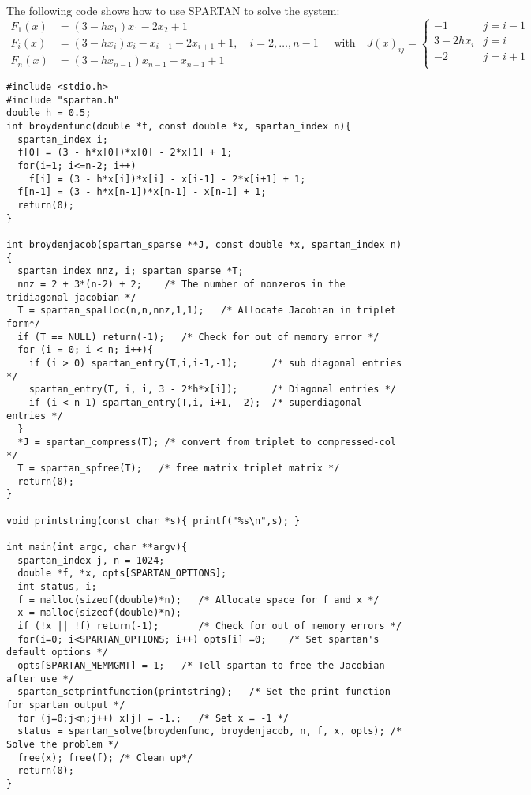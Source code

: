 \documentclass[10pt]{article}
\newcommand{\solverf}{\sffamily}
\newcommand{\spartan}{{\solverf SPARTAN}}
\begin{document}
The following code shows how to use \spartan{} to solve
the system:
\begin{equation}
\begin{aligned} F_1(x) &= (3 - h x_1)x_1 - 2 x_2 + 1 \\
              F_i(x) &= (3 - h x_i)x_i - x_{i-1} - 2 x_{i+1} + 1, \quad i=2, \ldots, n-1\\
              F_n(x) &= (3 - h x_{n-1}) x_{n-1} - x_{n-1} + 1
\end{aligned}
\quad \text{with} \quad
J(x)_{ij} = 
\begin{cases} -1 & j = i-1 \\
3 - 2hx_i        & j = i   \\
-2               & j = i+1 \\
\end{cases}
\end{equation}
\begin{Verbatim}[fontsize=\small]
#include <stdio.h>
#include "spartan.h"
double h = 0.5;
int broydenfunc(double *f, const double *x, spartan_index n){
  spartan_index i;
  f[0] = (3 - h*x[0])*x[0] - 2*x[1] + 1;
  for(i=1; i<=n-2; i++)
    f[i] = (3 - h*x[i])*x[i] - x[i-1] - 2*x[i+1] + 1;
  f[n-1] = (3 - h*x[n-1])*x[n-1] - x[n-1] + 1;
  return(0);
}

int broydenjacob(spartan_sparse **J, const double *x, spartan_index n){
  spartan_index nnz, i; spartan_sparse *T;
  nnz = 2 + 3*(n-2) + 2;    /* The number of nonzeros in the tridiagonal jacobian */
  T = spartan_spalloc(n,n,nnz,1,1);   /* Allocate Jacobian in triplet form*/ 
  if (T == NULL) return(-1);   /* Check for out of memory error */ 
  for (i = 0; i < n; i++){
    if (i > 0) spartan_entry(T,i,i-1,-1);      /* sub diagonal entries */ 
    spartan_entry(T, i, i, 3 - 2*h*x[i]);      /* Diagonal entries */ 
    if (i < n-1) spartan_entry(T,i, i+1, -2);  /* superdiagonal entries */
  }
  *J = spartan_compress(T); /* convert from triplet to compressed-col */
  T = spartan_spfree(T);   /* free matrix triplet matrix */
  return(0);
}

void printstring(const char *s){ printf("%s\n",s); }

int main(int argc, char **argv){
  spartan_index j, n = 1024;
  double *f, *x, opts[SPARTAN_OPTIONS]; 
  int status, i;
  f = malloc(sizeof(double)*n);   /* Allocate space for f and x */ 
  x = malloc(sizeof(double)*n);
  if (!x || !f) return(-1);       /* Check for out of memory errors */
  for(i=0; i<SPARTAN_OPTIONS; i++) opts[i] =0;    /* Set spartan's default options */
  opts[SPARTAN_MEMMGMT] = 1;   /* Tell spartan to free the Jacobian after use */
  spartan_setprintfunction(printstring);   /* Set the print function for spartan output */
  for (j=0;j<n;j++) x[j] = -1.;   /* Set x = -1 */
  status = spartan_solve(broydenfunc, broydenjacob, n, f, x, opts); /* Solve the problem */
  free(x); free(f); /* Clean up*/ 
  return(0);
}
\end{Verbatim}
\clearpage
\end{document}
